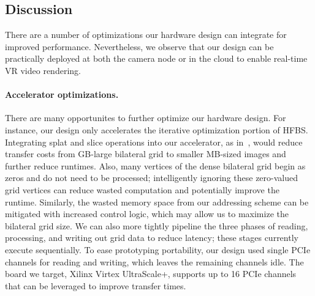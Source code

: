 \subsection{Discussion}
There are a number of optimizations our hardware design can integrate for improved performance.
Nevertheless, we observe that our design can be practically deployed at both the camera node or in the cloud to enable real-time VR video rendering.


\paragraph{Accelerator optimizations.}
There are many opportunites to further optimize our hardware design.
For instance, our design only accelerates the iterative optimization portion of HFBS.
Integrating splat and slice operations into our accelerator, as in~\cite{bilat_isscc}, would reduce transfer costs from GB-large bilateral grid to smaller MB-sized images and further reduce runtimes. 
Also, many vertices of the dense bilateral grid begin as zeros and do not need to be processed;  intelligently ignoring these zero-valued grid vertices can reduce wasted computation and potentially improve the runtime. 
Similarly, the wasted memory space from our addressing scheme can be mitigated with increased control logic, which may allow us to maximize the bilateral grid size.
We can also more tightly pipeline the three phases of reading, processing, and writing out grid data to reduce latency; these stages currently execute sequentially.
To ease prototyping portability, our design used single PCIe channels for reading and writing, which leaves the remaining channels idle. 
The board we target, Xilinx Virtex UltraScale+, supports up to 16 PCIe channels that can be leveraged to improve transfer times.

